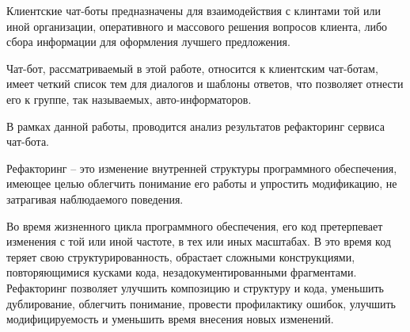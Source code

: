 Клиентские чат-боты предназначены для взаимодействия с клинтами той или иной организации,
оперативного и массового решения вопросов клиента, либо сбора информации
для оформления лучшего предложения.

Чат-бот, рассматриваемый в этой работе, относится к клиентским чат-ботам,
имеет четкий список тем для диалогов и шаблоны ответов, что позволяет отнести
его к группе, так называемых, авто-информаторов.

В рамках данной работы, проводится анализ результатов рефакторинг сервиса чат-бота.

Рефакторинг -- это изменение внутренней структуры программного обеспечения,
имеющее целью облегчить понимание его работы и упростить модификацию,
не затрагивая наблюдаемого поведения. \cite{refactoring.fowler}

Во время жизненного цикла программного обеспечения, его код претерпевает изменения
с той или иной частоте, в тех или иных масштабах. В это время код теряет свою
структурированность, обрастает сложными конструкциями, повторяющимися кусками кода,
незадокументированными фрагментами.
Рефакторинг позволяет улучшить композицию и структуру и кода, уменьшить дублирование,
облегчить понимание, провести профилактику ошибок, улучшить модифицируемость и
уменьшить время внесения новых изменений.


